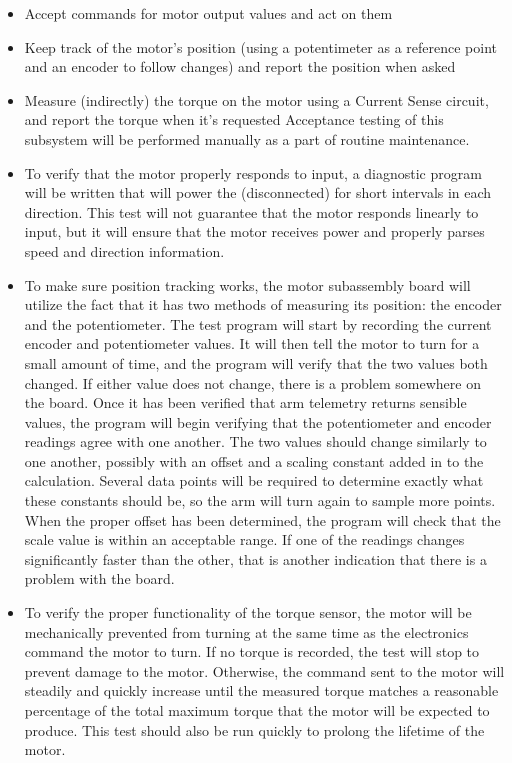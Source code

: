 \begin{itemize}


	\item Accept commands for motor output values and act on them
    \item Keep track of the motor's position (using a potentimeter as a reference point and an encoder to follow changes) and report the position when asked
    \item Measure (indirectly) the torque on the motor using a Current Sense circuit, and report the torque when it's requested
    \newline
    \newline
    Acceptance testing of this subsystem will be performed manually as a part of routine maintenance.
    \item To verify that the motor properly responds to input, a diagnostic program will be written that will power the (disconnected) for short intervals in each direction. This test will not guarantee that the motor responds linearly to input, but it will ensure that the motor receives power and properly parses speed and direction information.
    \newline
	\item To make sure position tracking works, the motor subassembly board will utilize the fact that it has two methods of measuring its position: the encoder and the potentiometer. The test program will start by recording the current encoder and potentiometer values. It will then tell the motor to turn for a small amount of time, and the program will verify that the two values both changed. If either value does not change, there is a problem somewhere on the board. Once it has been verified that arm telemetry returns sensible values, the program will begin verifying that the potentiometer and encoder readings agree with one another. The two values should change similarly to one another, possibly with an offset and a scaling constant added in to the calculation. Several data points will be required to determine exactly what these constants should be, so the arm will turn again to sample more points. When the proper offset has been determined, the program will check that the scale value is within an acceptable range. If one of the readings changes significantly faster than the other, that is another indication that there is a problem with the board.
    \newline
    \item To verify the proper functionality of the torque sensor, the motor will be mechanically prevented from turning at the same time as the electronics command the motor to turn. If no torque is recorded, the test will stop to prevent damage to the motor. Otherwise, the command sent to the motor will steadily and quickly increase until the measured torque matches a reasonable percentage of the total maximum torque that the motor will be expected to produce. This test should also be run quickly to prolong the lifetime of the motor.
\end{itemize}

